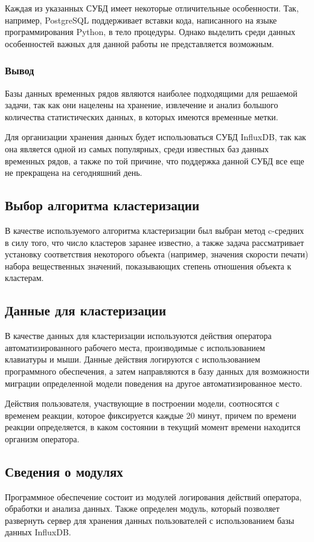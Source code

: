 Каждая из указанных СУБД имеет некоторые отличительные особенности. Так, например, PostgreSQL поддерживает вставки кода, написанного на языке программирования Python, в тело процедуры. Однако выделить среди данных особенностей важных для данной работы не представляется возможным.

\subsubsection*{Вывод}
Базы данных временных рядов являются наиболее подходящими для решаемой задачи, так как они нацелены на хранение, извлечение и анализ большого количества статистических данных, в которых имеются временные метки.

Для организации хранения данных будет использоваться СУБД InfluxDB, так как она является одной из самых популярных, среди известных баз данных временных рядов, а также по той причине, что поддержка данной СУБД все еще не прекращена на сегодняшний день.

\subsection{Выбор алгоритма кластеризации}
В качестве используемого алгоритма кластеризации был выбран метод c-средних в силу того, что число кластеров заранее известно, а также задача рассматривает установку соответствия некоторого объекта (например, значения скорости печати) набора вещественных значений, показывающих степень отношения объекта к кластерам.

\subsection{Данные для кластеризации}
В качестве данных для кластеризации используются действия оператора автоматизированного рабочего места, производимые с использованием клавиатуры и мыши. Данные действия логируются с использованием программного обеспечения, а затем направляются в базу данных для возможности миграции определенной модели поведения на другое автоматизированное место.

Действия пользователя, участвующие в построении модели, соотносятся с временем реакции, которое фиксируется каждые 20 минут, причем по времени реакции определяется, в каком состоянии в текущий момент времени находится организм оператора.

\subsection{Сведения о модулях}
Программное обеспечение состоит из модулей логирования действий оператора, обработки и анализа данных. Также определен модуль, который позволяет развернуть сервер для хранения данных пользователей с использованием базы данных InfluxDB.

